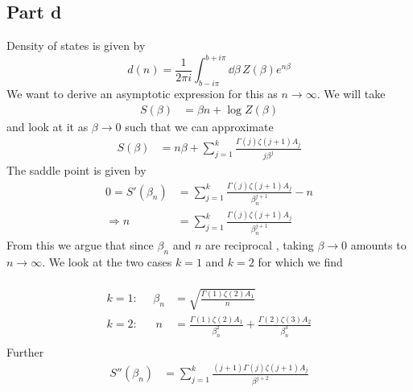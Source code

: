 \documentclass[a4paper,12pt]{article}
\begin{document}
\subsection*{Part d}
Density of states is given by
\begin{equation}
d(n)=\frac{1}{2\pi i}\int_{b-i\pi}^{b+i\pi}\dd \beta\,Z(\beta)e^{n\beta}
\end{equation}
We want to derive an asymptotic expression for this as $n\to\infty$. 
We will take 
\begin{equation}
	\begin{aligned}
		S(\beta)&=\beta n+ \log Z(\beta)
	\end{aligned}
\end{equation}
and look at it as $\beta\to 0$ such that we can approximate
\begin{equation}
	\begin{aligned}
		S(\beta)&=n\beta +
		\sum_{j=1}^{k}\frac{\Gamma(j)\zeta(j+1)A_j}{j\beta^{j}}
	\end{aligned}
\end{equation}
The saddle point is given by
\begin{equation}
	\begin{aligned}
		0=S'(\beta_n)
&=
	\sum_{j=1}^{k}\frac{\Gamma(j)\zeta(j+1)A_j}{\beta_n^{j+1}}-n\\
\Rightarrow n&=\sum_{j=1}^{k}\frac{\Gamma(j)\zeta(j+1)A_j}{\beta_n^{j+1}}
\end{aligned}
\end{equation}
From this we argue that since $\beta_n$ and $n$ are reciprocal , taking $\beta\to0$ amounts to $n\to \infty$. We look at the two cases $k=1$ and $k=2$ for which we find
\\\\
\begin{equation} \label{eq:condition}
	\begin{aligned}
		k=1:~~~~~~\beta_n&=\sqrt{\frac{\Gamma(1)\zeta(2)A_1}{n}}\\
		k=2:~~~~~~~n&=\frac{\Gamma(1)\zeta(2)A_1}{\beta_n^2}+\frac{\Gamma(2)\zeta(3)A_2}{\beta_n^3}\\
	\end{aligned}
\end{equation}
Further
\begin{equation}
	\begin{aligned}
		S''(\beta_n)&=\sum_{j=1}^{k}
		\frac{(j+1)\Gamma(j)\zeta(j+1)A_j}{\beta^{j+2}}
	\end{aligned}
\end{equation}
\end{document}

